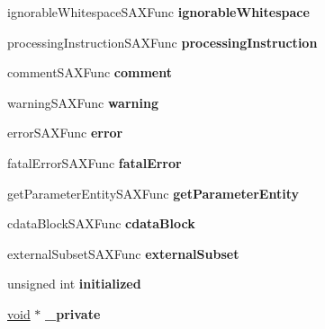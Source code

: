 \begin{DoxyCompactItemize}
ignorable\+Whitespace\+S\+A\+X\+Func {\bfseries ignorable\+Whitespace}
\item 
\mbox{\label{struct__xml_s_a_x_handler_ae8f014054dbf154e5578a992cf404420}} 
processing\+Instruction\+S\+A\+X\+Func {\bfseries processing\+Instruction}
\item 
\mbox{\label{struct__xml_s_a_x_handler_a2fd72a648cbaad634d9373fd70671468}} 
comment\+S\+A\+X\+Func {\bfseries comment}
\item 
\mbox{\label{struct__xml_s_a_x_handler_af5030a0179da46bacbb97331141c37ec}} 
warning\+S\+A\+X\+Func {\bfseries warning}
\item 
\mbox{\label{struct__xml_s_a_x_handler_a3b318039f5f91cd2cfaa4f8891971ef1}} 
error\+S\+A\+X\+Func {\bfseries error}
\item 
\mbox{\label{struct__xml_s_a_x_handler_aaf7f5ecd43a4d1f0da543739eadc5f3e}} 
fatal\+Error\+S\+A\+X\+Func {\bfseries fatal\+Error}
\item 
\mbox{\label{struct__xml_s_a_x_handler_ac587b0f30a919ff8b09ef31cf8c93150}} 
get\+Parameter\+Entity\+S\+A\+X\+Func {\bfseries get\+Parameter\+Entity}
\item 
\mbox{\label{struct__xml_s_a_x_handler_aca507297d40b148eec6abc88c1192646}} 
cdata\+Block\+S\+A\+X\+Func {\bfseries cdata\+Block}
\item 
\mbox{\label{struct__xml_s_a_x_handler_a654b66280cc146c53b7dff845f60d11f}} 
external\+Subset\+S\+A\+X\+Func {\bfseries external\+Subset}
\item 
\mbox{\label{struct__xml_s_a_x_handler_af965600ab43df87ce5a20063025001fa}} 
unsigned int {\bfseries initialized}
\item 
\mbox{\label{struct__xml_s_a_x_handler_a0206a8d061b3e408ec22ead7003a2c7a}} 
\hyperlink{interfacevoid}{void} $\ast$ {\bfseries \+\_\+private}
\item 

\end{DoxyCompactItemize}
